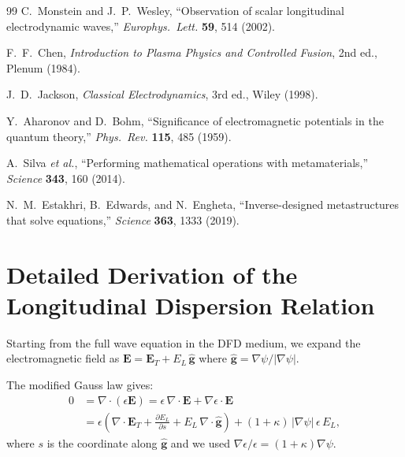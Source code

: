 \documentclass[aps,prd,twocolumn,superscriptaddress,nofootinbib,floatfix]{revtex4-2}
\newcommand{\psifield}{\psi}
\newcommand{\Evec}{\mathbf{E}}
\begin{document}
\begin{thebibliography}{99}
C.~Monstein and J.~P.~Wesley, ``Observation of scalar longitudinal
electrodynamic waves,'' \textit{Europhys.\ Lett.} \textbf{59},
514 (2002).

F.~F.~Chen, \textit{Introduction to Plasma Physics and Controlled
Fusion}, 2nd ed., Plenum (1984).

J.~D.~Jackson, \textit{Classical Electrodynamics}, 3rd ed.,
Wiley (1998).

Y.~Aharonov and D.~Bohm, ``Significance of electromagnetic
potentials in the quantum theory,'' \textit{Phys.\ Rev.}
\textbf{115}, 485 (1959).

A.~Silva \textit{et al.}, ``Performing mathematical operations
with metamaterials,'' \textit{Science} \textbf{343}, 160 (2014).

N.~M.~Estakhri, B.~Edwards, and N.~Engheta, ``Inverse-designed
metastructures that solve equations,'' \textit{Science}
\textbf{363}, 1333 (2019).

\end{thebibliography}

\clearpage

\appendix

\section{Detailed Derivation of the Longitudinal Dispersion Relation}
\label{app:dispersion}

Starting from the full wave equation in the DFD medium, we expand
the electromagnetic field as $\Evec = \Evec_T + E_L\,\hat{\mathbf{g}}$
where $\hat{\mathbf{g}} = \nabla\psifield/|\nabla\psifield|$.

The modified Gauss law gives:
\begin{align}
0 &= \nabla\cdot(\epsilon\Evec)
= \epsilon\,\nabla\cdot\Evec + \nabla\epsilon\cdot\Evec \nonumber\\
&= \epsilon\!\left(\nabla\cdot\Evec_T + \frac{\partial E_L}{\partial s}
+ E_L\,\nabla\cdot\hat{\mathbf{g}}\right)
+ (1+\kappa)\,|\nabla\psifield|\,\epsilon\,E_L,
\label{eq:app_gauss}
\end{align}
where $s$ is the coordinate along $\hat{\mathbf{g}}$ and we used
$\nabla\epsilon/\epsilon = (1+\kappa)\nabla\psifield$.
\end{document}
